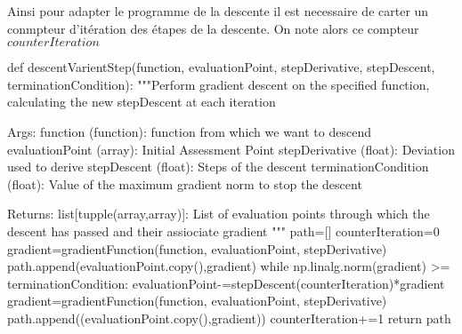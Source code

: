 \documentclass{article}
\begin{document}
\begin{python}

\end{python}

\newpage
Ainsi pour adapter le programme de la descente il est necessaire de carter un conmpteur d'itération des étapes de la descente. On note alors ce compteur $counterIteration$

\begin{python}[]
def descentVarientStep(function, evaluationPoint, stepDerivative, stepDescent, terminationCondition):
    """Perform gradient descent on the specified function, calculating the new stepDescent at each iteration

    Args:
        function (function): function from which we want to descend
        evaluationPoint (array): Initial Assessment Point
        stepDerivative (float): Deviation used to derive
        stepDescent (float): Steps of the descent
        terminationCondition (float): Value of the maximum gradient norm to stop the descent
        
    Returns:
        list[tupple(array,array)]: List of evaluation points through which the descent has passed and their assiociate gradient
    """
    path=[]
    counterIteration=0
    gradient=gradientFunction(function, evaluationPoint, stepDerivative)
    path.append(evaluationPoint.copy(),gradient)
    while np.linalg.norm(gradient) >= terminationCondition:
        evaluationPoint-=stepDescent(counterIteration)*gradient
        gradient=gradientFunction(function, evaluationPoint, stepDerivative)
        path.append((evaluationPoint.copy(),gradient))
        counterIteration+=1
    return path
\end{python}
\end{document}
